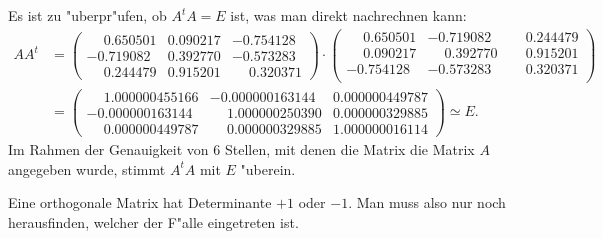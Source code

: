 \begin{loesung}
\begin{teilaufgaben}
\item Es ist zu "uberpr"ufen, ob $A^tA=E$ ist, was man direkt nachrechnen kann:
\begin{align*}
AA^t&=
\begin{pmatrix}
\phantom{-}0.650501&0.090217&          -0.754128\\
  -0.719082&0.392770&          -0.573283\\
\phantom{-}0.244479&0.915201&\phantom{-}0.320371
\end{pmatrix}
\cdot
\begin{pmatrix}
\phantom{-}0.650501&           -0.719082& \phantom{-}0.244479\\
\phantom{-}0.090217& \phantom{-}0.392770& \phantom{-}0.915201\\
  -0.754128&           -0.573283& \phantom{-}0.320371\\
\end{pmatrix}
\\
&=
\begin{pmatrix}
\phantom{-}1.000000455166&          -0.000000163144&0.000000449787\\
  -0.000000163144&\phantom{-}1.000000250390&0.000000329885\\
\phantom{-}0.000000449787&\phantom{-}0.000000329885&1.000000016114
\end{pmatrix}
\simeq E.
\end{align*}
Im Rahmen der Genauigkeit von 6 Stellen, mit denen die Matrix die
Matrix $A$ angegeben wurde, stimmt $A^tA$ mit $E$ "uberein.
\item Eine orthogonale Matrix hat Determinante $+1$ oder $-1$. Man muss
also nur noch herausfinden, welcher der F"alle eingetreten ist.


\end{teilaufgaben}
\end{loesung}
